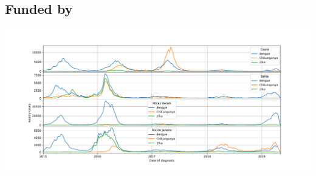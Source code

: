 \documentclass[a0,portrait]{a0poster}
\begin{document}
\begin{multicols}{3}
\section*{Funded by}
\begin{center}\vspace{0cm}
\includegraphics[width=0.95\linewidth]{figures/dcz_series.png}
\end{center}%


\end{multicols}
\end{document}
